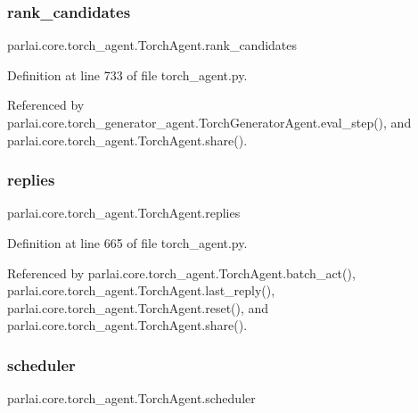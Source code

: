 \subsubsection{\texorpdfstring{rank\+\_\+candidates}{rank\_candidates}}
{\footnotesize\ttfamily parlai.\+core.\+torch\+\_\+agent.\+Torch\+Agent.\+rank\+\_\+candidates}



Definition at line 733 of file torch\+\_\+agent.\+py.



Referenced by parlai.\+core.\+torch\+\_\+generator\+\_\+agent.\+Torch\+Generator\+Agent.\+eval\+\_\+step(), and parlai.\+core.\+torch\+\_\+agent.\+Torch\+Agent.\+share().

\mbox{\label{classparlai_1_1core_1_1torch__agent_1_1TorchAgent_a5dd17721e788aafd51cd5af7bf7fc967}} 
\subsubsection{\texorpdfstring{replies}{replies}}
{\footnotesize\ttfamily parlai.\+core.\+torch\+\_\+agent.\+Torch\+Agent.\+replies}



Definition at line 665 of file torch\+\_\+agent.\+py.



Referenced by parlai.\+core.\+torch\+\_\+agent.\+Torch\+Agent.\+batch\+\_\+act(), parlai.\+core.\+torch\+\_\+agent.\+Torch\+Agent.\+last\+\_\+reply(), parlai.\+core.\+torch\+\_\+agent.\+Torch\+Agent.\+reset(), and parlai.\+core.\+torch\+\_\+agent.\+Torch\+Agent.\+share().

\mbox{\label{classparlai_1_1core_1_1torch__agent_1_1TorchAgent_a0affe6b199275c182a27c9aa07393347}} 
\subsubsection{\texorpdfstring{scheduler}{scheduler}}
{\footnotesize\ttfamily parlai.\+core.\+torch\+\_\+agent.\+Torch\+Agent.\+scheduler}




